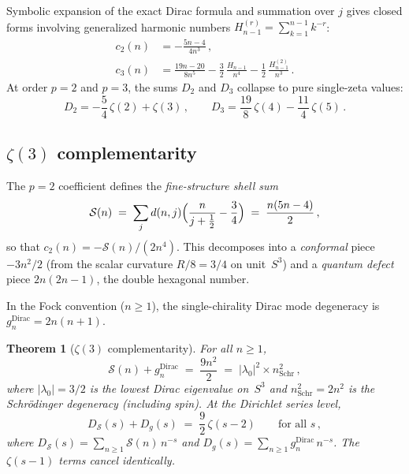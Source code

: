 \documentclass[11pt]{article}
\newtheorem{theorem}{Theorem}
\begin{document}
Symbolic expansion of the exact Dirac formula and summation over $j$
gives closed forms involving generalized harmonic numbers
$H_{n-1}^{(r)} = \sum_{k=1}^{n-1} k^{-r}$:
\begin{align}
  c_2(n) &= -\frac{5n - 4}{4n^3}\,, \\[3pt]
  c_3(n) &= \frac{19n-20}{8n^5}
    - \frac{3}{2}\,\frac{H_{n-1}}{n^4}
    - \frac{1}{2}\,\frac{H_{n-1}^{(2)}}{n^3}\,.
\end{align}
At order $p = 2$ and $p = 3$, the sums $D_2$ and $D_3$ collapse to
pure single-zeta values:
\begin{equation}
  D_2 = -\frac{5}{4}\,\zeta(2) + \zeta(3)\,,
  \qquad
  D_3 = \frac{19}{8}\,\zeta(4) - \frac{11}{4}\,\zeta(5)\,.
\end{equation}

\subsection{$\zeta(3)$ complementarity}

The $p = 2$ coefficient defines the \emph{fine-structure shell sum}
\begin{equation}
  \mathcal{S}(n) \;=\; \sum_j d(n,j)\Bigl(\frac{n}{j+\frac{1}{2}}
  - \frac{3}{4}\Bigr) \;=\; \frac{n(5n-4)}{2}\,,
\end{equation}
so that $c_2(n) = -\mathcal{S}(n)/(2n^4)$.
This decomposes into a \emph{conformal} piece $-3n^2/2$ (from the
scalar curvature $R/8 = 3/4$ on unit~$S^3$) and a \emph{quantum defect}
piece $2n(2n-1)$, the double hexagonal number.

In the Fock convention ($n \ge 1$), the single-chirality Dirac mode
degeneracy is $g_n^{\mathrm{Dirac}} = 2n(n+1)$.

\begin{theorem}[$\zeta(3)$ complementarity]
\label{thm:zeta3_complement}
For all $n \ge 1$,
\begin{equation}
\label{eq:shell_complement}
  \mathcal{S}(n) + g_n^{\mathrm{Dirac}} \;=\; \frac{9n^2}{2}
  \;=\; |\lambda_0|^2 \times n^2_{\mathrm{Schr}}\,,
\end{equation}
where $|\lambda_0| = 3/2$ is the lowest Dirac eigenvalue on~$S^3$
and $n^2_{\mathrm{Schr}} = 2n^2$ is the Schr\"odinger degeneracy
(including spin).
At the Dirichlet series level,
\begin{equation}
\label{eq:dirichlet_complement}
  D_{\mathcal{S}}(s) + D_{g}(s) \;=\; \frac{9}{2}\,\zeta(s{-}2)
  \qquad \text{for all } s\,,
\end{equation}
where $D_{\mathcal{S}}(s) = \sum_{n \ge 1} \mathcal{S}(n)\,n^{-s}$
and $D_{g}(s) = \sum_{n \ge 1} g_n^{\mathrm{Dirac}}\,n^{-s}$.
The $\zeta(s{-}1)$ terms cancel identically.
\end{theorem}
\end{document}
